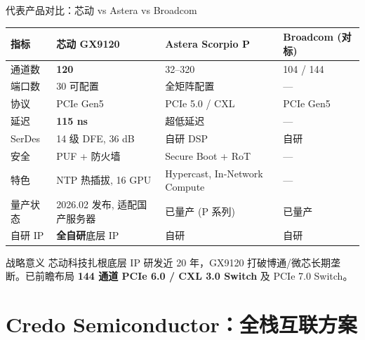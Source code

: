 \documentclass[aspectratio=169, 10pt, UTF8]{ctexbeamer}
\begin{document}
\begin{frame}{代表产品对比：芯动 vs Astera vs Broadcom}
  \centering
  \footnotesize
  \begin{tabularx}{\textwidth}{p{2.2cm} X X X}
    \toprule
    \textbf{指标} & \textbf{芯动 GX9120} & \textbf{Astera Scorpio P} & \textbf{Broadcom (对标)} \\
    \midrule
    通道数     & \textbf{120}                & 32--320                  & 104 / 144 \\
    端口数     & 30 可配置                   & 全矩阵配置                 & — \\
    协议       & PCIe Gen5                  & PCIe 5.0 / CXL            & PCIe Gen5 \\
    延迟       & \textbf{115 ns}             & 超低延迟                  & — \\
    SerDes     & 14 级 DFE, 36 dB           & 自研 DSP                  & 自研 \\
    安全       & PUF + 防火墙                & Secure Boot + RoT        & — \\
    特色       & NTP 热插拔, 16 GPU          & Hypercast, In-Network Compute & — \\
    量产状态   & 2026.02 发布, 适配国产服务器  & 已量产 (P 系列)            & 已量产 \\
    自研 IP    & \textbf{全自研}底层 IP        & 自研                      & 自研 \\
    \bottomrule
  \end{tabularx}

  \vspace{6pt}
  \begin{exampleblock}{战略意义}
    芯动科技扎根底层 IP 研发近 20 年，GX9120 打破博通/微芯长期垄断。已前瞻布局 \textbf{144 通道 PCIe 6.0 / CXL 3.0 Switch} 及 PCIe 7.0 Switch。
  \end{exampleblock}
\end{frame}
\section{Credo Semiconductor：全栈互联方案}
\end{document}
